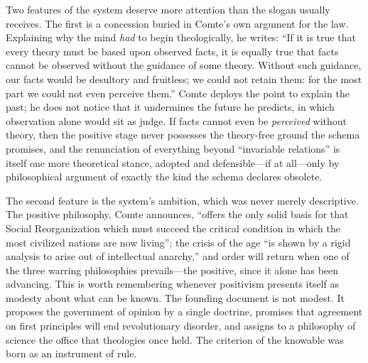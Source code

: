 Two features of the system deserve more attention than the slogan usually receives. The first is a concession buried in Comte's own argument for the law. Explaining why the mind \emph{had} to begin theologically, he writes: ``If it is true that every theory must be based upon observed facts, it is equally true that facts cannot be observed without the guidance of some theory. Without such guidance, our facts would be desultory and fruitless; we could not retain them: for the most part we could not even perceive them.'' Comte deploys the point to explain the past; he does not notice that it undermines the future he predicts, in which observation alone would sit as judge. If facts cannot even be \emph{perceived} without theory, then the positive stage never possesses the theory-free ground the schema promises, and the renunciation of everything beyond ``invariable relations'' is itself one more theoretical stance, adopted and defensible---if at all---only by philosophical argument of exactly the kind the schema declares obsolete.

The second feature is the system's ambition, which was never merely descriptive. The positive philosophy, Comte announces, ``offers the only solid basis for that Social Reorganization which must succeed the critical condition in which the most civilized nations are now living''; the crisis of the age ``is shown by a rigid analysis to arise out of intellectual anarchy,'' and order will return when one of the three warring philosophies prevails---the positive, since it alone has been advancing. This is worth remembering whenever positivism presents itself as modesty about what can be known. The founding document is not modest. It proposes the government of opinion by a single doctrine, promises that agreement on first principles will end revolutionary disorder, and assigns to a philosophy of science the office that theologies once held. The criterion of the knowable was born as an instrument of rule.

